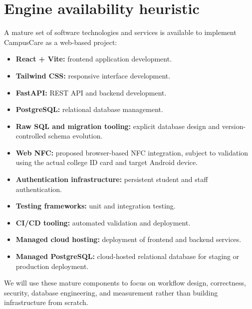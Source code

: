 \documentclass[11pt,a4paper]{article}
\begin{document}
\section{Engine availability heuristic}

A mature set of software technologies and services is available to implement CampusCare as a web-based project:

\begin{itemize}

    \item \textbf{React + Vite:} frontend application development.

    \item \textbf{Tailwind CSS:} responsive interface development.

    \item \textbf{FastAPI:} REST API and backend development.

    \item \textbf{PostgreSQL:} relational database management.

    \item \textbf{Raw SQL and migration tooling:} explicit database design and version-controlled schema evolution.

    \item \textbf{Web NFC:} proposed browser-based NFC integration, subject to validation using the actual college ID card and target Android device.

    \item \textbf{Authentication infrastructure:} persistent student and staff authentication.

    \item \textbf{Testing frameworks:} unit and integration testing.

    \item \textbf{CI/CD tooling:} automated validation and deployment.

    \item \textbf{Managed cloud hosting:} deployment of frontend and backend services.

    \item \textbf{Managed PostgreSQL:} cloud-hosted relational database for staging or production deployment.

\end{itemize}

We will use these mature components to focus on workflow design, correctness, security, database engineering, and measurement rather than building infrastructure from scratch.
\end{document}
